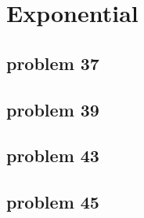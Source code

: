 \section{Exponential}

\subsection{problem 37}

\subsection{problem 39}

\subsection{problem 43}

\subsection{problem 45}


